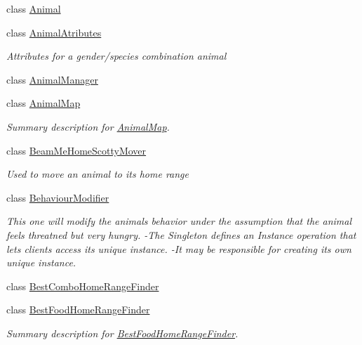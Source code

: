 \begin{DoxyCompactItemize}
\item 
class \hyperlink{class_s_e_a_r_c_h_1_1_animal}{Animal}
\item 
class \hyperlink{class_s_e_a_r_c_h_1_1_animal_atributes}{Animal\-Atributes}
\begin{DoxyCompactList}\small\item\em Attributes for a gender/species combination animal \end{DoxyCompactList}\item 
class \hyperlink{class_s_e_a_r_c_h_1_1_animal_manager}{Animal\-Manager}
\item 
class \hyperlink{class_s_e_a_r_c_h_1_1_animal_map}{Animal\-Map}
\begin{DoxyCompactList}\small\item\em Summary description for \hyperlink{class_s_e_a_r_c_h_1_1_animal_map}{Animal\-Map}. \end{DoxyCompactList}\item 
class \hyperlink{class_s_e_a_r_c_h_1_1_beam_me_home_scotty_mover}{Beam\-Me\-Home\-Scotty\-Mover}
\begin{DoxyCompactList}\small\item\em Used to move an animal to its home range \end{DoxyCompactList}\item 
class \hyperlink{class_s_e_a_r_c_h_1_1_behaviour_modifier}{Behaviour\-Modifier}
\begin{DoxyCompactList}\small\item\em This one will modify the animals behavior under the assumption that the animal feels threatned but very hungry. -\/\-The Singleton defines an Instance operation that lets clients access its unique instance. -\/\-It may be responsible for creating its own unique instance. \end{DoxyCompactList}\item 
class \hyperlink{class_s_e_a_r_c_h_1_1_best_combo_home_range_finder}{Best\-Combo\-Home\-Range\-Finder}
\begin{DoxyCompactList}\small\item\em \end{DoxyCompactList}\item 
class \hyperlink{class_s_e_a_r_c_h_1_1_best_food_home_range_finder}{Best\-Food\-Home\-Range\-Finder}
\begin{DoxyCompactList}\small\item\em Summary description for \hyperlink{class_s_e_a_r_c_h_1_1_best_food_home_range_finder}{Best\-Food\-Home\-Range\-Finder}. \end{DoxyCompactList}\item 

\end{DoxyCompactItemize}
